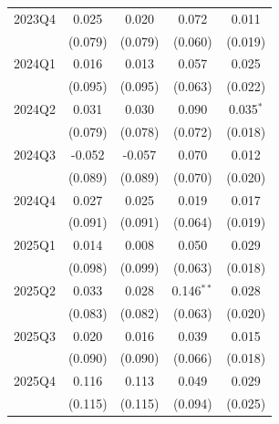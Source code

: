 \begin{table}[htbp]
\begin{tabular}{lcccc}
2023Q4 & 0.025 & 0.020 & 0.072 & 0.011 \\
 & (0.079) & (0.079) & (0.060) & (0.019) \\
2024Q1 & 0.016 & 0.013 & 0.057 & 0.025 \\
 & (0.095) & (0.095) & (0.063) & (0.022) \\
2024Q2 & 0.031 & 0.030 & 0.090 & 0.035$^{*}$ \\
 & (0.079) & (0.078) & (0.072) & (0.018) \\
2024Q3 & -0.052 & -0.057 & 0.070 & 0.012 \\
 & (0.089) & (0.089) & (0.070) & (0.020) \\
2024Q4 & 0.027 & 0.025 & 0.019 & 0.017 \\
 & (0.091) & (0.091) & (0.064) & (0.019) \\
2025Q1 & 0.014 & 0.008 & 0.050 & 0.029 \\
 & (0.098) & (0.099) & (0.063) & (0.018) \\
2025Q2 & 0.033 & 0.028 & 0.146$^{**}$ & 0.028 \\
 & (0.083) & (0.082) & (0.063) & (0.020) \\
2025Q3 & 0.020 & 0.016 & 0.039 & 0.015 \\
 & (0.090) & (0.090) & (0.066) & (0.018) \\
2025Q4 & 0.116 & 0.113 & 0.049 & 0.029 \\
 & (0.115) & (0.115) & (0.094) & (0.025) \\
\bottomrule
\end{tabular}
\par\vspace{2pt}{\footnotesize Reference quarter 2022Q3 omitted. Standard errors clustered on occupation in parentheses. * p<0.10, ** p<0.05, *** p<0.01.}
\end{table}
